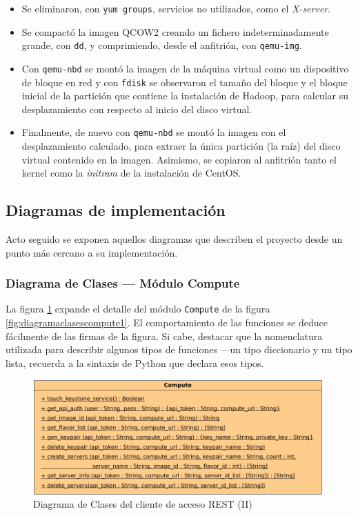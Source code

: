 \begin{itemize}
 \item Se eliminaron, con \texttt{yum groups}, servicios no utilizados, como el \emph{X-server}.
 \item Se compact\'o la imagen QCOW2 creando un fichero indeterminadamente grande, con \texttt{dd}, y comprimiendo, desde el anfitri\'on, con \texttt{qemu-img}.
 \item Con \texttt{qemu-nbd} se mont\'o la imagen de la m\'aquina virtual como un dispositivo de bloque en red y con \texttt{fdisk} se observaron el tama\~no del bloque y el bloque inicial de la partici\'on que contiene la instalaci\'on de Hadoop, para calcular su desplazamiento con respecto al inicio del disco virtual.
 \item Finalmente, de nuevo con \texttt{qemu-nbd} se mont\'o la imagen con el des\-pla\-za\-mien\-to calculado, para extraer la \'unica partici\'on (la ra\'iz) del disco virtual contenido en la imagen. Asimismo, se copiaron al anfitri\'on tanto el kernel como la \emph{initram} de la instalaci\'on de CentOS.
\end{itemize}



\subsection{Diagramas de implementaci\'on}\label{subsec:diagramasimpl}
\noindent Acto seguido se exponen aquellos diagramas que describen el proyecto desde un punto m\'as cercano a su implementaci\'on.


\subsubsection{Diagrama de Clases --- M\'odulo Compute}\label{subsubsec:implementacioncompute}
\noindent La figura \ref{fig:diagramaclasescompute2} expande el detalle del m\'odulo \texttt{Compute} de la figura \ref{fig:diagramaclasescompute1}. El comportamiento de las funciones se deduce f\'acilmente de las firmas de la figura. Si cabe, destacar que la nomenclatura utilizada para describir algunos tipos de funciones ---un tipo diccionario y un tipo lista, recuerda a la sintaxis de Python que declara esos tipos.

\begin{figure}[tbp]
\begin{center}
\includegraphics[width=0.99\textwidth]{imagenes/028.pdf}
 \caption{Diagrama de Clases del cliente de acceso REST (II)}
\label{fig:diagramaclasescompute2}
\end{center}
\end{figure}

